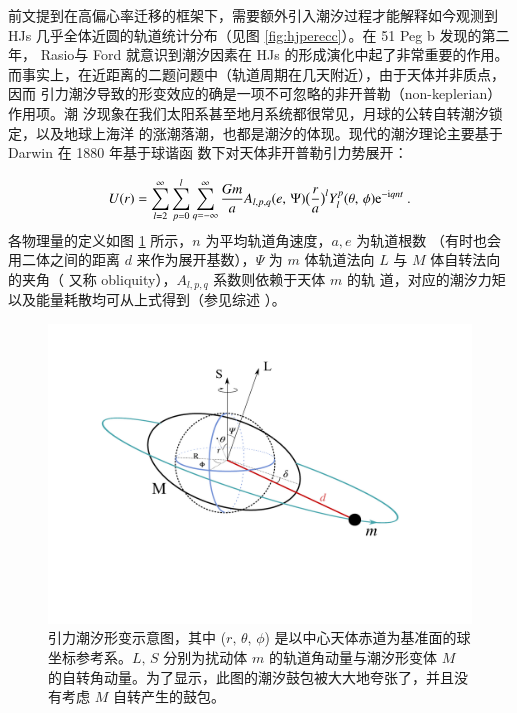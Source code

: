 前文提到在高偏心率迁移的框架下，需要额外引入潮汐过程才能解释如今观测到 HJs
几乎全体近圆的轨道统计分布（见图 \ref{fig:hjperecc}）。在 51 Peg b 发现的第二年，
Rasio与 Ford 就意识到潮汐因素在 HJs 的形成演化中起了非常重要的作用\cite{Rasio1996b}。
而事实上，在近距离的二题问题中（轨道周期在几天附近），由于天体并非质点，因而
引力潮汐导致的形变效应的确是一项不可忽略的非开普勒（non-keplerian）作用项。潮
汐现象在我们太阳系甚至地月系统都很常见，月球的公转自转潮汐锁定，以及地球上海洋
的涨潮落潮，也都是潮汐的体现。现代的潮汐理论主要基于 Darwin 在 1880 年基于球谐函
数下对天体非开普勒引力势展开\cite{Darwin1880}：

\begin{equation} \label{gravipotential}
U(r) = \sum\limits_{l=2}^\infty \sum\limits_{p=0}^l\sum\limits_{q=-\infty}^\infty \frac{Gm}{a} A_{l,p,q}(e,\,\Psi)\big(\frac{r}{a}\big)^l Y_l^p(\theta,\,\phi) \mathrm{e}^{-\mathrm{i}q n t} \ .
\end{equation} 
各物理量的定义如图 \ref{fig:tideillu} 所示，$n$ 为平均轨道角速度，$a,e$ 为轨道根数
（有时也会用二体之间的距离 $d$ 来作为展开基数），$\Psi$ 为 $m$ 体轨道法向 $L$ 
与 $M$ 体自转法向的夹角（ 又称 obliquity），$A_{l,p,q}$ 系数则依赖于天体 $m$ 的轨
道，对应的潮汐力矩以及能量耗散均可从上式得到（参见综述 ）。


\begin{figure}[t]
\centering
\includegraphics[width=1.0\textwidth]{figures/chapter4/fig4_tides.pdf}
\caption{引力潮汐形变示意图，其中 ($r,\,\theta,\,\phi$) 是以中心天体赤道为基准面的球坐标参考系。$L,\,S$ 分别为扰动体 $m$ 的轨道角动量与潮汐形变体 $M$ 的自转角动量。为了显示，此图的潮汐鼓包被大大地夸张了，并且没有考虑 $M$ 自转产生的鼓包。}
\label{fig:tideillu}
\end{figure}


